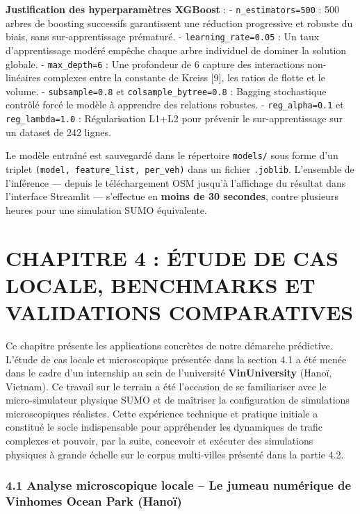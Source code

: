 \documentclass[10pt, a4paper]{article}
\begin{document}
\textbf{Justification des hyperparamètres XGBoost} : -
\texttt{n\_estimators=500} : 500 arbres de boosting successifs
garantissent une réduction progressive et robuste du biais, sans
sur-apprentissage prématuré. - \texttt{learning\_rate=0.05} : Un taux
d'apprentissage modéré empêche chaque arbre individuel de dominer la
solution globale. - \texttt{max\_depth=6} : Une profondeur de 6 capture
des interactions non-linéaires complexes entre la constante de Kreiss
{[}9{]}, les ratios de flotte et le volume. - \texttt{subsample=0.8} et
\texttt{colsample\_bytree=0.8} : Bagging stochastique contrôlé forcé le
modèle à apprendre des relations robustes. - \texttt{reg\_alpha=0.1} et
\texttt{reg\_lambda=1.0} : Régularisation L1+L2 pour prévenir le
sur-apprentissage sur un dataset de 242 lignes.

Le modèle entraîné est sauvegardé dans le répertoire \texttt{models/}
sous forme d'un triplet
\texttt{(model,\ feature\_list,\ \textquotesingle{}per\_veh\textquotesingle{})}
dans un fichier \texttt{.joblib}. L'ensemble de l'inférence --- depuis
le téléchargement OSM jusqu'à l'affichage du résultat dans l'interface
Streamlit --- s'effectue en \textbf{moins de 30 secondes}, contre
plusieurs heures pour une simulation SUMO équivalente.

\newpage

\section{CHAPITRE 4 : ÉTUDE DE CAS LOCALE, BENCHMARKS ET VALIDATIONS
COMPARATIVES}\label{chapitre-4-uxe9tude-de-cas-locale-benchmarks-et-validations-comparatives}

Ce chapitre présente les applications concrètes de notre démarche
prédictive. L'étude de cas locale et microscopique présentée dans la
section 4.1 a été menée dans le cadre d'un internship au sein de
l'université \textbf{VinUniversity} (Hanoï, Vietnam). Ce travail sur le
terrain a été l'occasion de se familiariser avec le micro-simulateur
physique SUMO et de maîtriser la configuration de simulations
microscopiques réalistes. Cette expérience technique et pratique
initiale a constitué le socle indispensable pour appréhender les
dynamiques de trafic complexes et pouvoir, par la suite, concevoir et
exécuter des simulations physiques à grande échelle sur le corpus
multi-villes présenté dans la partie 4.2.

\subsubsection{4.1 Analyse microscopique locale -- Le jumeau numérique
de Vinhomes Ocean Park
(Hanoï)}\label{analyse-microscopique-locale-le-jumeau-numuxe9rique-de-vinhomes-ocean-park-hanouxef}
\end{document}
